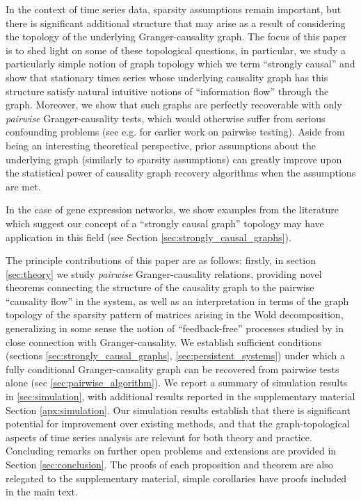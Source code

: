 \documentclass{statsoc}
\begin{document}
In the context of time series data, sparsity assumptions remain
important, but there is significant additional structure that may
arise as a result of considering the topology of the underlying
Granger-causality graph.  The focus of this paper is to shed light on
some of these topological questions, in particular, we study a
particularly simple notion of graph topology which we term
``strongly causal'' and show that stationary times series whose
underlying causality graph has this structure satisfy natural
intuitive notions of ``information flow'' through the graph.
Moreover, we show that such graphs are perfectly recoverable with only
\textit{pairwise} Granger-causality tests, which would otherwise
suffer from serious confounding problems (see
e.g. \cite{tam2013gene_pwgc} for earlier work on pairwise testing).
Aside from being an interesting theoretical perspective, prior
assumptions about the underlying graph (similarly to sparsity
assumptions) can greatly improve upon the statistical power of
causality graph recovery algorithms when the assumptions are met.

In the case of gene expression networks, we show examples from the
literature which suggest our concept of a ``strongly causal graph''
topology may have application in this field (see Section
\ref{sec:strongly_causal_graphs}).

The principle contributions of this paper are as follows: firstly, in
section \ref{sec:theory} we study \textit{pairwise} Granger-causality
relations, providing novel theorems connecting the structure of the
causality graph to the pairwise ``causality flow'' in the system, as
well as an interpretation in terms of the graph topology of the
sparsity pattern of matrices arising in the Wold decomposition,
generalizing in some sense the notion of ``feedback-free'' processes
studied by \cite{caines1975feedback} in close connection with
Granger-causality.  We establish sufficient conditions (sections
\ref{sec:strongly_causal_graphs}, \ref{sec:persistent_systems}) under
which a fully conditional Granger-causality graph can be recovered
from pairwise tests alone (sec \ref{sec:pairwise_algorithm}).  We
report a summary of simulation results in \ref{sec:simulation}, with
additional results reported in the supplementary material Section
\ref{apx:simulation}.  Our simulation results establish that there is
significant potential for improvement over existing methods, and that
the graph-topological aspects of time series analysis are relevant for
both theory and practice.  Concluding remarks on further open problems
and extensions are provided in Section \ref{sec:conclusion}.  The
proofs of each proposition and theorem are also relegated to the
supplementary material, simple corollaries have proofs included in the
main text.
\end{document}
